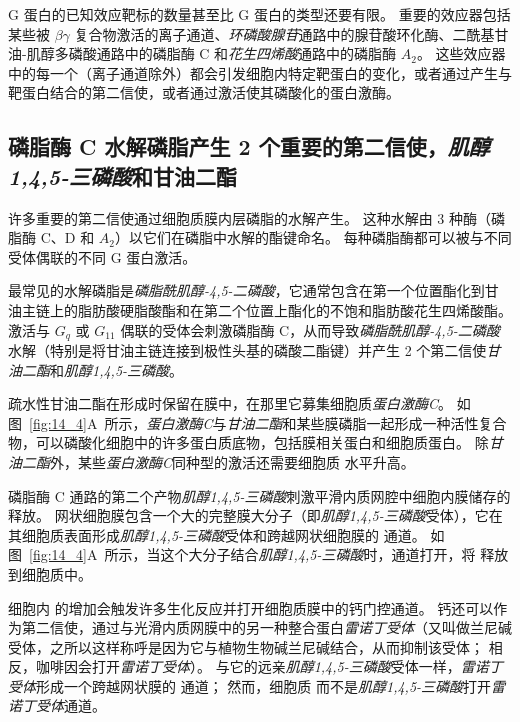 G 蛋白的已知效应靶标的数量甚至比 G 蛋白的类型还要有限。
重要的效应器包括某些被 $\beta \gamma$ 复合物激活的离子通道、\textit{环磷酸腺苷}通路中的腺苷酸环化酶、二酰基甘油-肌醇多磷酸通路中的磷脂酶 C 和\textit{花生四烯酸}通路中的磷脂酶 $A_2$。
这些效应器中的每一个（离子通道除外）都会引发细胞内特定靶蛋白的变化，或者通过产生与靶蛋白结合的第二信使，或者通过激活使其磷酸化的蛋白激酶。



\subsection{磷脂酶 C 水解磷脂产生 2 个重要的第二信使，\textit{肌醇1,4,5-三磷酸}和甘油二酯}

许多重要的第二信使通过细胞质膜内层磷脂的水解产生。
这种水解由 3 种酶（磷脂酶 C、D 和 $A_2$）以它们在磷脂中水解的酯键命名。
每种磷脂酶都可以被与不同受体偶联的不同 G 蛋白激活。


最常见的水解磷脂是\textit{磷脂酰肌醇-4,5-二磷酸}，它通常包含在第一个位置酯化到甘油主链上的脂肪酸硬脂酸酯和在第二个位置上酯化的不饱和脂肪酸花生四烯酸酯。
激活与 $ G_q $ 或 $ G_{11} $ 偶联的受体会刺激磷脂酶 C，从而导致\textit{磷脂酰肌醇-4,5-二磷酸}水解（特别是将甘油主链连接到极性头基的磷酸二酯键）并产生 2 个第二信使\textit{甘油二酯}和\textit{肌醇1,4,5-三磷酸}。


疏水性甘油二酯在形成时保留在膜中，在那里它募集细胞质\textit{蛋白激酶C}。
如图~\ref{fig:14_4}A~所示，\textit{蛋白激酶C}与\textit{甘油二酯}和某些膜磷脂一起形成一种活性复合物，可以磷酸化细胞中的许多蛋白质底物，包括膜相关蛋白和细胞质蛋白。
除\textit{甘油二酯}外，某些\textit{蛋白激酶C}同种型的激活还需要细胞质  水平升高。


磷脂酶 C 通路的第二个产物\textit{肌醇1,4,5-三磷酸}刺激平滑内质网腔中细胞内膜储存的  释放。
网状细胞膜包含一个大的完整膜大分子（即\textit{肌醇1,4,5-三磷酸}受体），它在其细胞质表面形成\textit{肌醇1,4,5-三磷酸}受体和跨越网状细胞膜的  通道。
如图~\ref{fig:14_4}A~所示，当这个大分子结合\textit{肌醇1,4,5-三磷酸}时，通道打开，将  释放到细胞质中。


细胞内  的增加会触发许多生化反应并打开细胞质膜中的钙门控通道。
钙还可以作为第二信使，通过与光滑内质网膜中的另一种整合蛋白\textit{雷诺丁受体}（又叫做兰尼碱受体，之所以这样称呼是因为它与植物生物碱兰尼碱结合，从而抑制该受体；
相反，咖啡因会打开\textit{雷诺丁受体}）。
与它的远亲\textit{肌醇1,4,5-三磷酸}受体一样，\textit{雷诺丁受体}形成一个跨越网状膜的  通道；
然而，细胞质  而不是\textit{肌醇1,4,5-三磷酸}打开\textit{雷诺丁受体}通道。


